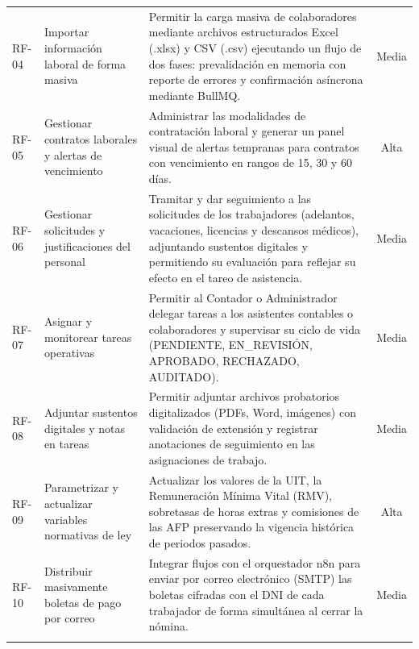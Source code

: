 {\begin{longtable}{@{}p{1.4cm}p{4.4cm}p{8.2cm}c@{}}
        RF-04 & 
        Importar información laboral de forma masiva & 
        Permitir la carga masiva de colaboradores mediante archivos estructurados Excel (.xlsx) y CSV (.csv) ejecutando un flujo de dos fases: prevalidación en memoria con reporte de errores y confirmación asíncrona mediante BullMQ. &
        Media \\ \addlinespace

        RF-05 & 
        Gestionar contratos laborales y alertas de vencimiento & 
        Administrar las modalidades de contratación laboral y generar un panel visual de alertas tempranas para contratos con vencimiento en rangos de 15, 30 y 60 días. &
        Alta \\ \addlinespace

        RF-06 &
        Gestionar solicitudes y justificaciones del personal & 
        Tramitar y dar seguimiento a las solicitudes de los trabajadores (adelantos, vacaciones, licencias y descansos médicos), adjuntando sustentos digitales y permitiendo su evaluación para reflejar su efecto en el tareo de asistencia. &
        Media \\ \addlinespace

        RF-07 & 
        Asignar y monitorear tareas operativas & 
        Permitir al Contador o Administrador delegar tareas a los asistentes contables o colaboradores y supervisar su ciclo de vida (PENDIENTE, EN\_REVISIÓN, APROBADO, RECHAZADO, AUDITADO). &
        Media \\ \addlinespace

        RF-08 & 
        Adjuntar sustentos digitales y notas en tareas & 
        Permitir adjuntar archivos probatorios digitalizados (PDFs, Word, imágenes) con validación de extensión y registrar anotaciones de seguimiento en las asignaciones de trabajo. &
        Media \\ \addlinespace

        RF-09 & 
        Parametrizar y actualizar variables normativas de ley & 
        Actualizar los valores de la UIT, la Remuneración Mínima Vital (RMV), sobretasas de horas extras y comisiones de las AFP preservando la vigencia histórica de periodos pasados. &
        Alta \\ \addlinespace

        RF-10 & 
        Distribuir masivamente boletas de pago por correo & 
        Integrar flujos con el orquestador n8n para enviar por correo electrónico (SMTP) las boletas cifradas con el DNI de cada trabajador de forma simultánea al cerrar la nómina. &
        Media \\ \addlinespace


\end{longtable}}
